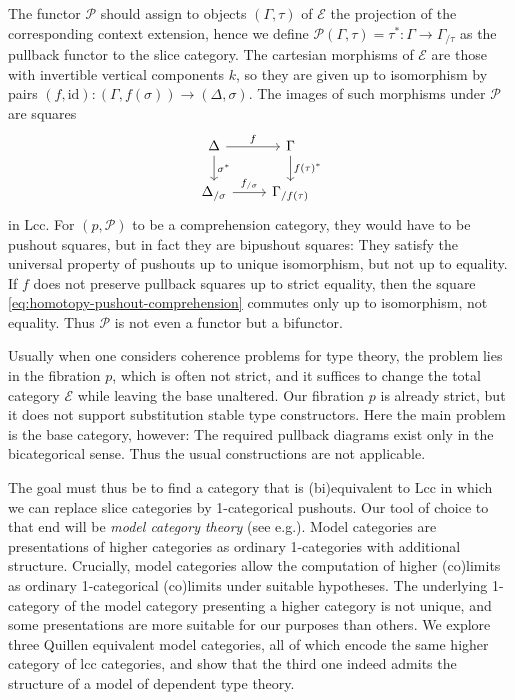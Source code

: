 \documentclass[a4paper]{article}
\theoremstyle{remark}
\theoremstyle{definition}
\begin{document}
The functor $\mathcal{P}$ should assign to objects $(\Gamma, \tau)$ of $\mathcal{E}$ the projection of the corresponding context extension, hence we define $\mathcal{P}(\Gamma, \tau) = \tau^* : \Gamma \rightarrow \Gamma_{/ \tau}$ as the pullback functor to the slice category.
The cartesian morphisms of $\mathcal{E}$ are those with invertible vertical components $k$, so they are given up to isomorphism by pairs $(f, \mathrm{id}) : (\Gamma, f(\sigma)) \rightarrow (\Delta, \sigma)$.
The images of such morphisms under $\mathcal{P}$ are squares
\begin{equation}
  \label{eq:homotopy-pushout-comprehension}
  \begin{tikzcd}
    \Delta \arrow[d, "\sigma^*"] \arrow[r, "f"] & \Gamma \arrow[d, "f(\tau)^*"] \\
    \Delta_{/ \sigma} \arrow[r, "f_{/ \sigma}"] & \Gamma_{/ f(\tau)}
  \end{tikzcd}
\end{equation}
in $\mathrm{Lcc}$.
For $(p, \mathcal{P})$ to be a comprehension category, they would have to be pushout squares, but in fact they are bipushout squares:
They satisfy the universal property of pushouts up to unique isomorphism, but not up to equality.
If $f$ does not preserve pullback squares up to strict equality, then the square \eqref{eq:homotopy-pushout-comprehension} commutes only up to isomorphism, not equality.
Thus $\mathcal{P}$ is not even a functor but a bifunctor.

Usually when one considers coherence problems for type theory, the problem lies in the fibration $p$, which is often not strict, and it suffices to change the total category $\mathcal{E}$ while leaving the base unaltered.
Our fibration $p$ is already strict, but it does not support substitution stable type constructors.
Here the main problem is the base category, however:
The required pullback diagrams exist only in the bicategorical sense.
Thus the usual constructions \citep{on-the-interpretation-of-type-theory-in-lcc-categories,the-local-universes-model} are not applicable.

The goal must thus be to find a category that is (bi)equivalent to $\mathrm{Lcc}$ in which we can replace slice categories by 1-categorical pushouts.
Our tool of choice to that end will be \emph{model category theory} (see e.g.\@ \citet{hirschhorn}).
Model categories are presentations of higher categories as ordinary 1-categories with additional structure.
Crucially, model categories allow the computation of higher (co)limits as ordinary 1-categorical (co)limits under suitable hypotheses.
The underlying 1-category of the model category presenting a higher category is not unique, and some presentations are more suitable for our purposes than others.
We explore three Quillen equivalent model categories, all of which encode the same higher category of lcc categories, and show that the third one indeed admits the structure of a model of dependent type theory.
\end{document}
